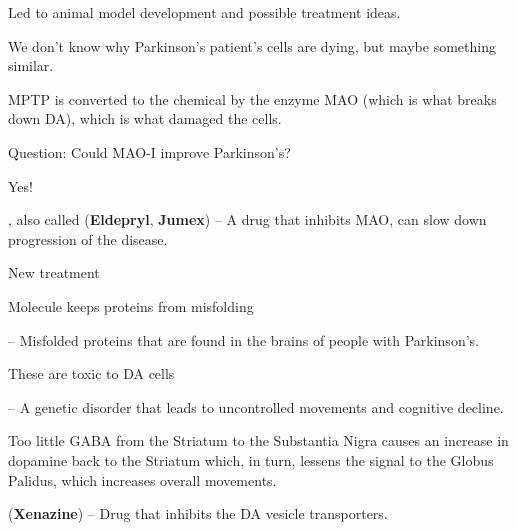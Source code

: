 \begin{coloredlist}
\begin{coloredlist}
\begin{coloredlist}
\begin{coloredlist}
\begin{coloredlist}
\begin{coloredlist}
\begin{coloredlist}
                            \item Led to animal model development and possible treatment ideas.
                        \end{coloredlist}
                    \end{coloredlist}
                \end{coloredlist}
                \item We don't know why Parkinson's patient's cells are dying, but maybe something similar.
                \item MPTP is converted to the chemical  by the enzyme MAO (which is what breaks down DA), which is what damaged the cells.
                \begin{coloredlist}
                    \item Question: Could MAO-I improve Parkinson's?
                    \item Yes!
                    \item {}, also called  (\textbf{Eldepryl}, \textbf{Jumex}) -- A drug that inhibits MAO, can slow down progression of the disease.
                \end{coloredlist}
            \end{coloredlist}        
        \end{coloredlist}
        \item New treatment
        \begin{coloredlist}
            \item Molecule keeps proteins from misfolding
            \item {} -- Misfolded proteins that are found in the brains of people with Parkinson's.
            \begin{coloredlist}
                \item These are toxic to DA cells
            \end{coloredlist}
        \end{coloredlist}
        \item {} -- A genetic disorder that leads to uncontrolled movements and cognitive decline.
        \begin{coloredlist}
            \item Too little GABA from the Striatum to the Substantia Nigra causes an increase in dopamine back to the Striatum which, in turn, lessens the signal to the Globus Palidus, which increases overall movements.
            \item {} (\textbf{Xenazine}) -- Drug that inhibits the DA vesicle transporters.

\end{coloredlist}
\end{coloredlist}
\end{coloredlist}
